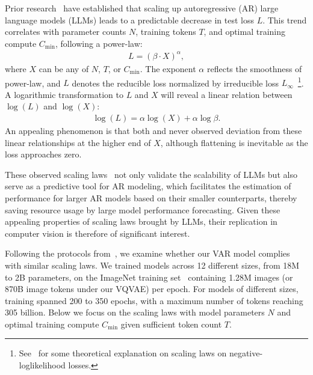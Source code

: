 Prior research~\cite{scalinglaw,scalingar,chinchilla,gpt4} have established that scaling up autoregressive (AR) large language models (LLMs) leads to a predictable decrease in test loss $L$.
This trend correlates with parameter counts $N$, training tokens $T$, and optimal training compute $C_\text{min}$, following a power-law:\vspace{1pt}
\begin{align}
    L = (\beta \cdot X)^{\alpha},
\end{align}
where $X$ can be any of $N$, $T$, or $C_\text{min}$.
The exponent $\alpha$ reflects the smoothness of power-law, and $L$ denotes the reducible loss normalized by irreducible loss $L_{\infty}$~\cite{scalingar}\footnote{See~\cite{scalingar} for some theoretical explanation on scaling laws on negative-loglikelihood losses.}.
A logarithmic transformation to $L$ and $X$ will reveal a linear relation between $\log(L)$ and $\log(X)$:\vspace{1pt}
\begin{align}
    \log(L) = \alpha \log (X) + \alpha \log\beta.
\end{align}
An appealing phenomenon is that both \cite{scalinglaw} and \cite{scalingar} never observed deviation from these linear relationships at the higher end of $X$, although flattening is inevitable as the loss approaches zero.

These observed scaling laws~\cite{scalinglaw,scalingar,chinchilla,gpt4} not only validate the scalability of LLMs but also serve as a predictive tool for AR modeling, which facilitates the estimation of performance for larger AR models based on their smaller counterparts, thereby saving resource usage by large model performance forecasting.
Given these appealing properties of scaling laws brought by LLMs, their replication in computer vision is therefore of significant interest.

\vspace{4pt}
Following the protocols from~\cite{scalinglaw,scalingar,chinchilla,gpt4}, we examine whether our VAR model complies with similar scaling laws.
We trained models across 12 different sizes, from 18M to 2B parameters, on the ImageNet training set~\cite{imagenet} containing 1.28M images (or 870B image tokens under our VQVAE) per epoch.
For models of different sizes, training spanned 200 to 350 epochs, with a maximum number of tokens reaching 305 billion.
Below we focus on the scaling laws with model parameters $N$ and optimal training compute $C_\text{min}$ given sufficient token count $T$.

